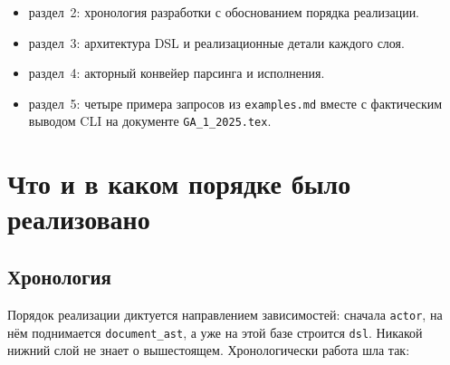 \documentclass[12pt,a4paper]{article}
\newcommand{\code}[1]{\texttt{#1}}
\begin{document}
\begin{itemize}
  \item раздел~2: хронология разработки с обоснованием
        порядка реализации.
  \item раздел~3: архитектура DSL и реализационные детали
        каждого слоя.
  \item раздел~4: акторный конвейер парсинга и исполнения.
  \item раздел~5: четыре примера запросов из
        \code{examples.md} вместе с фактическим выводом CLI на
        документе \code{GA\_1\_2025.tex}.
\end{itemize}

\section{Что и в каком порядке было реализовано}

\subsection{Хронология}

Порядок реализации диктуется направлением зависимостей: сначала
\code{actor}, на нём поднимается \code{document\_ast}, а уже на этой
базе строится \code{dsl}. Никакой нижний слой не знает о вышестоящем.
Хронологически работа шла так:
\end{document}
